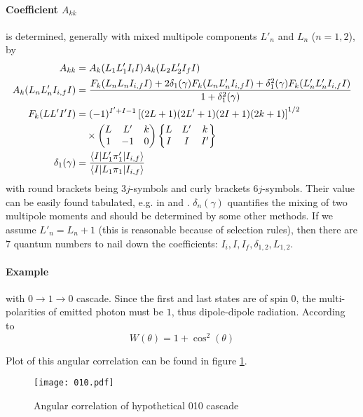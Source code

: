 \paragraph{Coefficient $A_{kk}$} is determined, generally with mixed multipole components $L'_n$ and $L_n$ ($n=1,2$), by
\begin{align}
   A_{kk} &= A_k(L_1 L_1' I_i I) A_k(L_2 L'_2 I_f I) \\
   A_k(L_n L'_n I_{i,f} I) &= \frac{F_k(L_n L_n I_{i,f} I) + 2 \delta_1(\gamma) F_k (L_n L'_n I_{i,f} I) + \delta_1^2(\gamma) F_{k}(L'_n L'_n I_{i,f} I)}{1 + \delta^2_1 (\gamma)} \\
   F_k(L L' I' I) &= (-1)^{I'+I-1} \left[ (2L + 1) (2L' + 1)(2I+1) (2k+1) \right]^{1/2} \notag \\
     & \quad \times \begin{pmatrix} L & L' & k \\ 1 & -1 & 0 \end{pmatrix} \begin{Bmatrix} L & L' & k \\ I & I & I'\end{Bmatrix} \\
   \delta_1 (\gamma) &= \frac{\braket{I | L'_1 \pi'_1 | I_{i,f}}}{ \braket{I | L_1 \pi_1 | I_{i,f}}}
\end{align}
with round brackets being $3j$-symbols and curly brackets $6j$-symbols\cite{siegbahn}. Their value can be easily found tabulated, e.g. in \cite{STEVENSON2002853} and \cite{369j}. $\delta_{n}(\gamma)$ quantifies the mixing of two multipole moments and should be determined by some other methods. If we assume $L'_n = L_n + 1$ (this is reasonable because of selection rules), then there are $7$ quantum numbers to nail down the coefficients: $I_i, I, I_f, \delta_{1,2}, L_{1,2}$\cite{siegbahn}.

\paragraph{Example} with $0 \rightarrow 1 \rightarrow 0$ \gag cascade. Since the first and last states are of spin $0$, the multi-polarities of emitted photon must be $1$, thus dipole-dipole radiation. According to~\cite{deutsch}
\begin{equation}
   W(\theta) = 1 + \cos^{2}(\theta)
   \label{math:W010}
\end{equation}

Plot of this angular correlation can be found in figure \ref{W010}.
\begin{figure}[ht]
   \centering
   \texttt{[image: 010.pdf]}
   \caption{Angular correlation of hypothetical 010 cascade}%
   \label{W010}
\end{figure}

